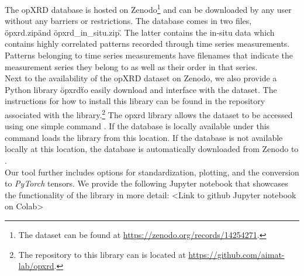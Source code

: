 The opXRD database is hosted on Zenodo\footnote{The dataset can be found at \url{https://zenodo.org/records/14254271}.} and can be downloaded by any user without any barriers or restrictions. The database comes in two files, \"opxrd.zip\" and \"opxrd\_in\_situ.zip\". The latter contains the in-situ data which contains highly correlated patterns recorded through time series measurements. Patterns belonging to time series measurements have filenames that indicate the measurement series they belong to as well as their order in that series. \\

Next to the availability of the opXRD dataset on Zenodo, we also provide a Python library \"opxrd\" to easily download and interface with the dataset. The instructions for how to install this library can be found in the repository associated with the library.\footnote{The repository to this library can is located at \url{https://github.com/aimat-lab/opxrd}.} The opxrd library allows the dataset to be accessed using one simple command . If the database is locally available under  this command loads the library from this location. If the database is not available locally at this location, the database is automatically downloaded from Zenodo to . \\

Our tool further includes options for standardization, plotting, and the conversion to \emph{PyTorch} tensors.
We provide the following Jupyter notebook that showcases the functionality of the library in more detail: <Link to github Jupyter notebook on Colab>

